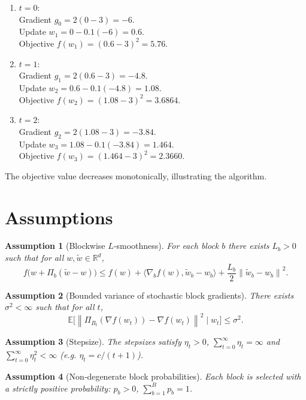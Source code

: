 \documentclass{article}
\newtheorem{assumption}{Assumption}
\newcommand{\E}{\mathbb{E}}
\newcommand{\R}{\mathbb{R}}
\newcommand{\norm}[1]{\left\|#1\right\|}
\begin{document}
\begin{enumerate}[label=Iter \arabic*:, leftmargin=*]
\item $t=0$: \\
Gradient $g_{0}=2(0-3)=-6$.\\
Update $w_{1}=0-0.1(-6)=0.6$.\\
Objective $f(w_{1})=(0.6-3)^{2}=5.76$.
\item $t=1$: \\
Gradient $g_{1}=2(0.6-3)=-4.8$.\\
Update $w_{2}=0.6-0.1(-4.8)=1.08$.\\
Objective $f(w_{2})=(1.08-3)^{2}=3.6864$.
\item $t=2$: \\
Gradient $g_{2}=2(1.08-3)=-3.84$.\\
Update $w_{3}=1.08-0.1(-3.84)=1.464$.\\
Objective $f(w_{3})=(1.464-3)^{2}=2.3660$.
\end{enumerate}

The objective value decreases monotonically, illustrating the algorithm.

\section*{Assumptions}
\begin{assumption}[Blockwise $L$‑smoothness]\label{as:smooth}
For each block $b$ there exists $L_{b}>0$ such that for all $w,\tilde w\in\R^{d}$,
\[
f\bigl(w+ \Pi_{b}( \tilde w-w)\bigr)
\le f(w)+\langle \nabla_{b}f(w),\tilde w_{b}-w_{b}\rangle
+\frac{L_{b}}{2}\norm{\tilde w_{b}-w_{b}}^{2}.
\tag{2}
\]
\end{assumption}
\begin{assumption}[Bounded variance of stochastic block gradients]\label{as:var}
There exists $\sigma^{2}<\infty$ such that for all $t$,
\[
\E\bigl[\norm{\Pi_{B_{t}}(\nabla f(w_{t}))-\nabla f(w_{t})}^{2}\mid w_{t}\bigr]\le\sigma^{2}.
\tag{3}
\]
\end{assumption}
\begin{assumption}[Stepsize]\label{as:stepsize}
The stepsizes satisfy $\eta_{t}>0$, $\sum_{t=0}^{\infty}\eta_{t}= \infty$ and
$\sum_{t=0}^{\infty}\eta_{t}^{2}<\infty$ (e.g. $\eta_{t}=c/(t+1)$).
\end{assumption}
\begin{assumption}[Non‑degenerate block probabilities]\label{as:prob}
Each block is selected with a strictly positive probability:
$p_{b}>0$, $\sum_{b=1}^{B}p_{b}=1$.
\end{assumption}
\end{document}
